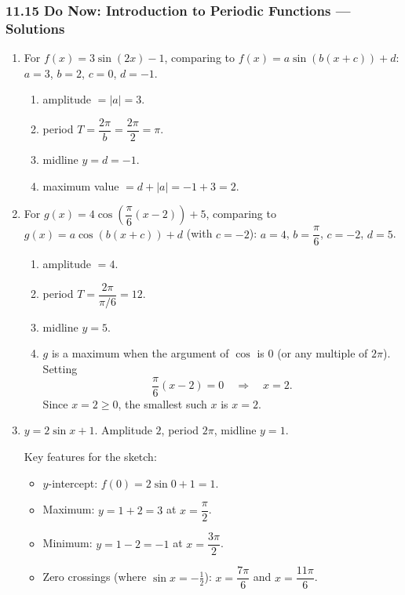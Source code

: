 \documentclass[12pt, twoside]{article}
\begin{document}
\subsubsection*{11.15 Do Now: Introduction to Periodic Functions --- Solutions}

\begin{enumerate}[itemsep=0.4cm]

\item For $f(x) = 3\sin(2x) - 1$, comparing to $f(x) = a\sin(b(x+c)) + d$:
$a = 3$, $b = 2$, $c = 0$, $d = -1$.

\begin{enumerate}[itemsep=0.1cm]
  \item[(a)] amplitude $= |a| = 3$.
  \item[(b)] period $T = \dfrac{2\pi}{b} = \dfrac{2\pi}{2} = \pi$.
  \item[(c)] midline $y = d = -1$.
  \item[(d)] maximum value $= d + |a| = -1 + 3 = 2$.
\end{enumerate}

\item For $g(x) = 4\cos\!\left(\dfrac{\pi}{6}(x - 2)\right) + 5$, comparing to $g(x) = a\cos(b(x+c)) + d$ (with $c = -2$):
$a = 4$, $b = \dfrac{\pi}{6}$, $c = -2$, $d = 5$.

\begin{enumerate}[itemsep=0.1cm]
  \item[(a)] amplitude $= 4$.
  \item[(b)] period $T = \dfrac{2\pi}{\pi/6} = 12$.
  \item[(c)] midline $y = 5$.
  \item[(d)] $g$ is a maximum when the argument of $\cos$ is $0$ (or any multiple of $2\pi$). Setting
  $$\dfrac{\pi}{6}(x - 2) = 0 \quad\Longrightarrow\quad x = 2.$$
  Since $x = 2 \ge 0$, the smallest such $x$ is $\boxed{x = 2}$.
\end{enumerate}

\item $y = 2\sin x + 1$. \quad Amplitude $2$, period $2\pi$, midline $y = 1$.

\smallskip

Key features for the sketch:

\begin{itemize}[itemsep=0cm]
  \item $y$-intercept: $f(0) = 2\sin 0 + 1 = 1$.
  \item Maximum: $y = 1 + 2 = 3$ at $x = \dfrac{\pi}{2}$.
  \item Minimum: $y = 1 - 2 = -1$ at $x = \dfrac{3\pi}{2}$.
  \item Zero crossings (where $\sin x = -\tfrac{1}{2}$): $x = \dfrac{7\pi}{6}$ and $x = \dfrac{11\pi}{6}$.
\end{itemize}


\end{enumerate}
\end{document}
